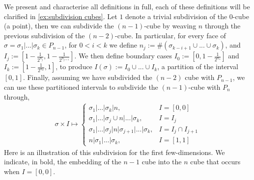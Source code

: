 \documentclass{amsart}
\theoremstyle{definition}
\begin{document}
We present and characterise all definitions in full, each of these definitions will be clarified in \cref{ex:subdivision cubes}.
Let $1$ denote a trivial subdivision of the $0$-cube (a point), then we can subdivide the $(n-1)$-cube by weaving $n$ through the previous subdivision of the $(n-2)$-cube. 
In particular, for every face of $\sigma = \sigma_1|...|\sigma_k \in P_{n-1}$, for $0<i<k$ we define
$n_j := \#(\sigma_{k-i+1}\cup...\cup \sigma_k)$, and 
$I_j := [1 - \frac{1}{2^{n_j}}, 1 - \frac{1}{2^{n_{j+1}}}]$.
We then define boundary cases $I_0:= [0,1 - \frac{1}{2^{n_1}}]$ and $I_k:= [1 - \frac{1}{2^{n_k}},1]$, to  produce $I(\sigma) := I_0 \cup ... \cup I_k$, a partition of the interval $[0,1]$.
Finally, assuming we have subdivided the $(n-2)$ cube with $P_{n-1}$, we can use these partitioned intervals to subdivide the $(n-1)$-cube with $P_n$ through,
\begin{align} \label{eq:In inductive def}
    \sigma \times I \mapsto 
    \begin{cases}
        \sigma_1|...|\sigma_k| n, &I = [0, 0]\\
        \sigma_1|...|\sigma_j \cup n|...|\sigma_k, &I = I_j\\
        \sigma_1|...|\sigma_j|n|\sigma_{j+1}|...|\sigma_k, &I = I_j \cap I_{j+1}\\
        n|\sigma_1|...|\sigma_k, &I = [1, 1]
    \end{cases}
\end{align}
Here is an illustration of this subdivision for the first few-dimensions.
We indicate, in bold, the embedding of the $n-1$ cube into the $n$ cube that occurs when $I=[0, 0]$. 
\end{document}
